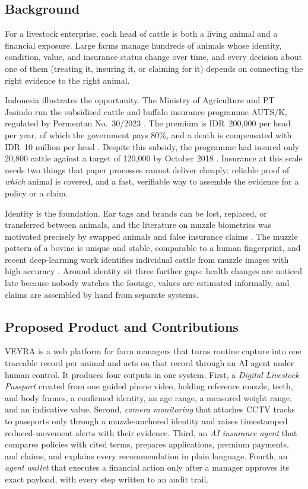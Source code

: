 \documentclass[11pt,letterpaper]{article}
\begin{document}
\subsection{Background}

For a livestock enterprise, each head of cattle is both a living animal and a financial exposure. Large farms manage hundreds of animals whose identity, condition, value, and insurance status change over time, and every decision about one of them (treating it, insuring it, or claiming for it) depends on connecting the right evidence to the right animal.

Indonesia illustrates the opportunity. The Ministry of Agriculture and PT Jasindo run the subsidised cattle and buffalo insurance programme AUTS/K, regulated by Permentan No.~30/2023 \cite{ipb2025auts}. The premium is IDR~200{,}000 per head per year, of which the government pays 80\%, and a death is compensated with IDR~10 million per head \cite{jae2022auts,republika2019}. Despite this subsidy, the programme had insured only 20{,}800 cattle against a target of 120{,}000 by October 2018 \cite{kontan2018}. Insurance at this scale needs two things that paper processes cannot deliver cheaply: reliable proof of \emph{which} animal is covered, and a fast, verifiable way to assemble the evidence for a policy or a claim.

Identity is the foundation. Ear tags and brands can be lost, replaced, or transferred between animals, and the literature on muzzle biometrics was motivated precisely by swapped animals and false insurance claims \cite{kumar2017muzzle}. The muzzle pattern of a bovine is unique and stable, comparable to a human fingerprint, and recent deep-learning work identifies individual cattle from muzzle images with high accuracy \cite{kumar2017muzzle,li2022muzzle}. Around identity sit three further gaps: health changes are noticed late because nobody watches the footage, values are estimated informally, and claims are assembled by hand from separate systems.

\subsection{Proposed Product and Contributions}

VEYRA is a web platform for farm managers that turns routine capture into one traceable record per animal and acts on that record through an AI agent under human control. It produces four outputs in one system. First, a \emph{Digital Livestock Passport} created from one guided phone video, holding reference muzzle, teeth, and body frames, a confirmed identity, an age range, a measured weight range, and an indicative value. Second, \emph{camera monitoring} that attaches CCTV tracks to passports only through a muzzle-anchored identity and raises timestamped reduced-movement alerts with their evidence. Third, an \emph{AI insurance agent} that compares policies with cited terms, prepares applications, premium payments, and claims, and explains every recommendation in plain language. Fourth, an \emph{agent wallet} that executes a financial action only after a manager approves its exact payload, with every step written to an audit trail.
\end{document}
